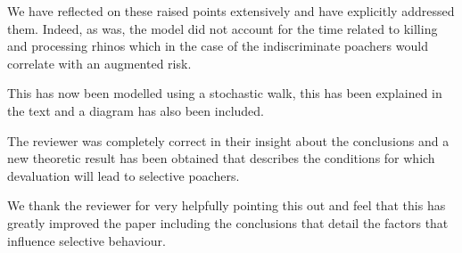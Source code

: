 \documentclass[10pt]{article}
\begin{document}
We have reflected on these raised points extensively and have explicitly
addressed them. Indeed, as was, the model did not account for the
time related to killing and processing rhinos which in the case of the
indiscriminate poachers would correlate with an augmented risk.

This has now been modelled using a stochastic walk, this has been
explained in the text and a diagram has also been included.

The reviewer was completely correct in their insight about the conclusions and
a new theoretic result has been obtained that describes the conditions for which
devaluation will lead to selective poachers.

We thank the reviewer for very helpfully pointing this out and feel that this
has greatly improved the paper including the conclusions that detail the factors
that influence selective behaviour.
\end{document}
